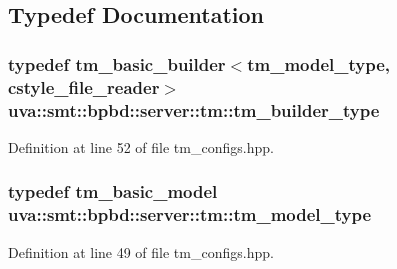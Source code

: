\subsection{Typedef Documentation}
\hypertarget{namespaceuva_1_1smt_1_1bpbd_1_1server_1_1tm_a8217600aaa61d65d5e569fec3b50828b}{}
\subsubsection[{tm\+\_\+builder\+\_\+type}]{\setlength{\rightskip}{0pt plus 5cm}typedef {\bf tm\+\_\+basic\+\_\+builder}$<${\bf tm\+\_\+model\+\_\+type}, {\bf cstyle\+\_\+file\+\_\+reader}$>$ {\bf uva\+::smt\+::bpbd\+::server\+::tm\+::tm\+\_\+builder\+\_\+type}}\label{namespaceuva_1_1smt_1_1bpbd_1_1server_1_1tm_a8217600aaa61d65d5e569fec3b50828b}


Definition at line 52 of file tm\+\_\+configs.\+hpp.

\hypertarget{namespaceuva_1_1smt_1_1bpbd_1_1server_1_1tm_a2f41d3b9fcee3dddc005fd7e7deae402}{}
\subsubsection[{tm\+\_\+model\+\_\+type}]{\setlength{\rightskip}{0pt plus 5cm}typedef {\bf tm\+\_\+basic\+\_\+model} {\bf uva\+::smt\+::bpbd\+::server\+::tm\+::tm\+\_\+model\+\_\+type}}\label{namespaceuva_1_1smt_1_1bpbd_1_1server_1_1tm_a2f41d3b9fcee3dddc005fd7e7deae402}


Definition at line 49 of file tm\+\_\+configs.\+hpp.

